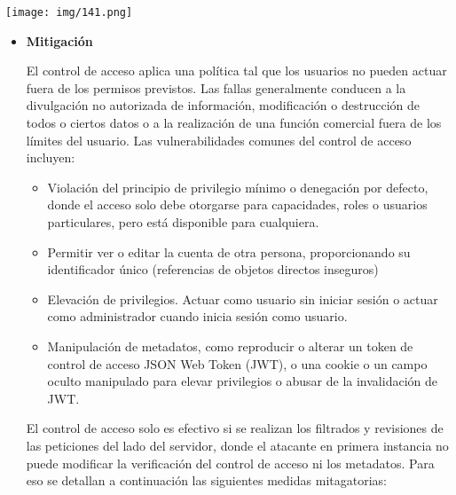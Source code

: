 \documentclass[12pt,oneside,a4paper]{book}
\begin{document}
\begin{enumerate}
\vspace{1em}

\begin{center}
    \texttt{[image: img/141.png]}
\end{center}

\vspace{2em}

\begin{itemize}
	\item 	\textbf{Mitigación}

\vspace{1em}

\hspace{20pt}
El control de acceso aplica una política tal que los usuarios no pueden actuar fuera de los permisos previstos. Las fallas generalmente conducen a la divulgación no autorizada de información, modificación o destrucción de todos o ciertos datos o a la realización de una función comercial fuera de los límites del usuario. Las vulnerabilidades comunes del control de acceso incluyen:

\vspace{1em}

\begin{itemize}
\item Violación del principio de privilegio mínimo o denegación por defecto, donde el acceso solo debe otorgarse para capacidades, roles o usuarios particulares, pero está disponible para cualquiera.
\item Permitir ver o editar la cuenta de otra persona, proporcionando su identificador único (referencias de objetos directos inseguros)
\item Elevación de privilegios. Actuar como usuario sin iniciar sesión o actuar como administrador cuando inicia sesión como usuario.
\item Manipulación de metadatos, como reproducir o alterar un token de control de acceso JSON Web Token (JWT), o una cookie o un campo oculto manipulado para elevar privilegios o abusar de la invalidación de JWT.
\end{itemize}

\vspace{1em}

\hspace{20pt}
El control de acceso solo es efectivo si se realizan los filtrados y revisiones de las peticiones del lado del servidor, donde el atacante en primera instancia no puede modificar la verificación del control de acceso ni los metadatos. Para eso se detallan a continuación las siguientes medidas mitagatorias:


\end{itemize}
\end{enumerate}
\end{document}
